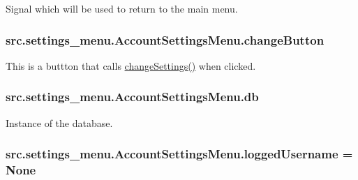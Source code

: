 Signal which will be used to return to the main menu. 

\hypertarget{classsrc_1_1settings__menu_1_1_account_settings_menu_a6ad9267209290b0eaa3ef35191f81d82}{}
\subsubsection[{change\+Button}]{\setlength{\rightskip}{0pt plus 5cm}src.\+settings\+\_\+menu.\+Account\+Settings\+Menu.\+change\+Button}\label{classsrc_1_1settings__menu_1_1_account_settings_menu_a6ad9267209290b0eaa3ef35191f81d82}


This is a buttton that calls \hyperlink{classsrc_1_1settings__menu_1_1_account_settings_menu_a10989536edbbe0db4fc03f2e5ccc8271}{change\+Settings()} when clicked. 

\hypertarget{classsrc_1_1settings__menu_1_1_account_settings_menu_a793f0abcc421d4f7e51d6ff02e3e86ea}{}
\subsubsection[{db}]{\setlength{\rightskip}{0pt plus 5cm}src.\+settings\+\_\+menu.\+Account\+Settings\+Menu.\+db}\label{classsrc_1_1settings__menu_1_1_account_settings_menu_a793f0abcc421d4f7e51d6ff02e3e86ea}


Instance of the database. 

\hypertarget{classsrc_1_1settings__menu_1_1_account_settings_menu_a7cac3d6c4fd01c1d0c9e6cfcba8e8950}{}
\subsubsection[{logged\+Username}]{\setlength{\rightskip}{0pt plus 5cm}src.\+settings\+\_\+menu.\+Account\+Settings\+Menu.\+logged\+Username = None\hspace{0.3cm}{\ttfamily [static]}}\label{classsrc_1_1settings__menu_1_1_account_settings_menu_a7cac3d6c4fd01c1d0c9e6cfcba8e8950}


